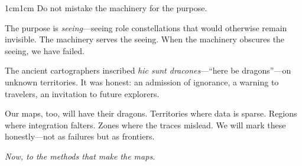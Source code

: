 \documentclass[../main.tex]{subfiles}
\begin{document}
\begin{adjustwidth}{1cm}{1cm}
Do not mistake the machinery for the purpose.

The purpose is \textit{seeing}---seeing role constellations that would otherwise remain invisible. The machinery serves the seeing. When the machinery obscures the seeing, we have failed.

The ancient cartographers inscribed \textit{hic sunt dracones}---``here be dragons''---on unknown territories. It was honest: an admission of ignorance, a warning to travelers, an invitation to future explorers.

Our maps, too, will have their dragons. Territories where data is sparse. Regions where integration falters. Zones where the traces mislead. We will mark these honestly---not as failures but as frontiers.

\vspace{1cm}

\begin{center}
\textit{Now, to the methods that make the maps.}
\end{center}

\vspace{0.5cm}

\begin{center}
\end{center}

\end{adjustwidth}

\closeintermezzo
\end{document}

